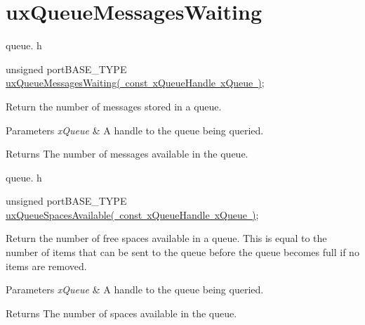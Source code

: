 \hypertarget{group__ux_queue_messages_waiting}{}\section{ux\+Queue\+Messages\+Waiting}
\label{group__ux_queue_messages_waiting}
queue. h 
\begin{DoxyPre}unsigned portBASE\_TYPE \mbox{\hyperlink{queue_8h_a70075cb97b8b84e947a169f3123f78a6}{uxQueueMessagesWaiting( const xQueueHandle xQueue )}};\end{DoxyPre}


Return the number of messages stored in a queue.


\begin{DoxyParams}{Parameters}
{\em x\+Queue} & A handle to the queue being queried.\\
\hline
\end{DoxyParams}
\begin{DoxyReturn}{Returns}
The number of messages available in the queue.
\end{DoxyReturn}
queue. h 
\begin{DoxyPre}unsigned portBASE\_TYPE \mbox{\hyperlink{queue_8h_a8a887a95a919759fd6b8439d67ea87bb}{uxQueueSpacesAvailable( const xQueueHandle xQueue )}};\end{DoxyPre}


Return the number of free spaces available in a queue. This is equal to the number of items that can be sent to the queue before the queue becomes full if no items are removed.


\begin{DoxyParams}{Parameters}
{\em x\+Queue} & A handle to the queue being queried.\\
\hline
\end{DoxyParams}
\begin{DoxyReturn}{Returns}
The number of spaces available in the queue. 
\end{DoxyReturn}
